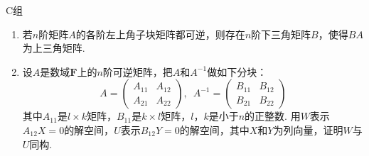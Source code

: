 \centerline{\heiti C组}
\begin{enumerate}
    \item 若$n$阶矩阵$A$的各阶左上角子块矩阵都可逆，则存在$n$阶下三角矩阵$B$，使得$BA$为上三角矩阵.

    \item 设$A$是数域$\mathbf{F}$上的$n$阶可逆矩阵，把$A$和$A^{-1}$做如下分块：
          \[A=\begin{pmatrix}
                  A_{11} & A_{12} \\ A_{21} & A_{22}
              \end{pmatrix},\enspace A^{-1}=\begin{pmatrix}
                  B_{11} & B_{12} \\ B_{21} & B_{22}
              \end{pmatrix}\]
          其中$A_{11}$是$l \times k$矩阵，$B_{11}$是$k \times l$矩阵，$l$，$k$是小于$n$的正整数. 用$W$表示$A_{12}X=0$的解空间，$U$表示$B_{12}Y=0$的解空间，其中$X$和$Y$为列向量，证明$W$与$U$同构.
\end{enumerate}
